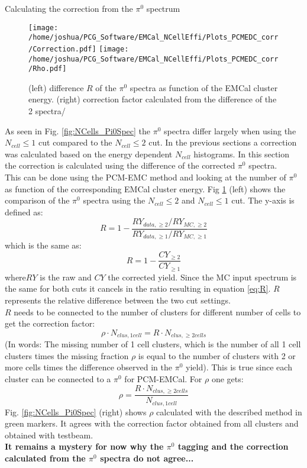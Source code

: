 \documentclass[ALICE]{ALICE_analysis_notes}
\newcommand{\PZ}{$\pi^0$\xspace}
\begin{document}
\begin{section}{Calculating the correction from the \PZ spectrum}
	\begin{figure}[ht!]
		\centering
		\texttt{[image: /home/joshua/PCG\_Software/EMCal\_NCellEffi/Plots\_PCMEDC\_corr/Correction.pdf]}
		\texttt{[image: /home/joshua/PCG\_Software/EMCal\_NCellEffi/Plots\_PCMEDC\_corr/Rho.pdf]}
		\caption{ (left) difference $R$ of the \PZ spectra as function of the EMCal cluster energy. (right) correction factor calculated from the difference of the 2 spectra/}
		\label{fig:NCellEff_from spectrum}
		
	\end{figure}
	
	As seen in Fig. \ref{fig:NCells_Pi0Spec} the \PZ spectra differ largely when using the $N_{cell} \leq 1$ cut compared to the $N_{cell} \leq 2$ cut. In the previous sections a correction was calculated based on the energy dependent $N_{cell}$ histograms. In this section the correction is calculated using the difference of the corrected \PZ spectra. \\
	This can be done using the PCM-EMC method and looking at the number of \PZ as function of the corresponding EMCal cluster energy. Fig \ref{fig:NCellEff_from spectrum} (left) shows the comparison of the \PZ spectra using the $N_{cell} \leq 2$ and $N_{cell} \leq 1$ cut. The y-axis is defined as:
	\begin{equation}
	R = 1 - \frac{RY_{data, \geq 2} / RY_{MC, \geq 2}}{RY_{data, \geq 1} / RY_{MC, \geq 1}}
	\label{eq:R}
	\end{equation}
	which is the same as:
	\begin{equation}
	R = 1 - \frac{CY_{\geq2}}{CY_{\geq1}}
	\end{equation}
	where$RY$ is the raw and $CY$ the corrected yield. Since the MC input spectrum is the same for both cuts it cancels in the ratio resulting in equation \ref{eq:R}. $R$ represents the relative difference between the two cut settings.\\
	$R$ needs to be connected to the number of clusters for different number of cells to get the correction factor:
	\begin{equation}
	\rho \cdot N_{clus, 1 cell}= R \cdot N_{clus, \geq 2 cells}
	\end{equation}
	(In words: The missing number of 1 cell clusters, which is the number of all 1 cell clusters times the missing fraction $\rho$ is equal to the number of clusters with 2 or more cells times the difference observed in the \PZ yield). This is true since each cluster can be connected to a \PZ for PCM-EMCal. For $\rho$ one gets:
	\begin{equation}
	\rho = \frac{R \cdot N_{clus, \geq 2 cells}}{N_{clus, 1 cell}}
	\end{equation}
	Fig. \ref{fig:NCells_Pi0Spec} (right) shows $\rho$ calculated with the described method in green markers. It agrees with the correction factor obtained from all clusters and obtained with testbeam. \\
	\textbf{It remains a mystery for now why the \PZ tagging and the correction calculated from the \PZ spectra do not agree...}
	

\end{section}
\end{document}
